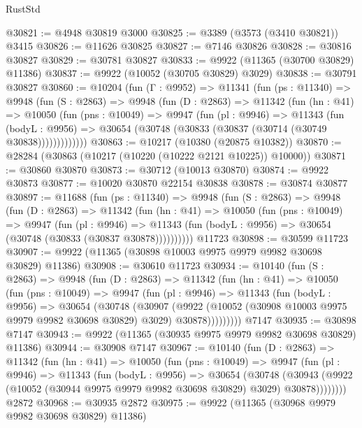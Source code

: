 \begin{lexlean}{RustStd}
\begin{coremodule}
@30821 := @4948 @30819 @3000
@30825 := @3389 (@3573 (@3410 @30821)) @3415
@30826 := @11626 @30825
@30827 := @7146 @30826
@30828 := @30816 @30827
@30829 := @30781 @30827
@30833 := @9922 (@11365 (@30700 @30829) @11386)
@30837 := @9922 (@10052 (@30705 @30829) @3029)
@30838 := @30791 @30827
@30860 := @10204
    (fun (Γ : @9952) =>
    @11341
      (fun (ps : @11340) =>
      @9948
        (fun (S : @2863) =>
        @9948
          (fun (D : @2863) =>
          @11342
            (fun (hn : @41) =>
            @10050
              (fun (pns : @10049) =>
              @9947
                (fun (pl : @9946) =>
                @11343
                  (fun (bodyL : @9956) =>
                  @30654 (@30748 (@30833 (@30837 (@30714 (@30749 @30838)))))))))))))
@30863 := @10217 (@10380 (@20875 @10382))
@30870 := @28284 (@30863 (@10217 (@10220 (@10222 @2121 @10225)) @10000))
@30871 := @30860 @30870
@30873 := @30712 (@10013 @30870)
@30874 := @9922 @30873
@30877 := @10020 @30870 @22154 @30838
@30878 := @30874 @30877
@30897 := @11688
    (fun (ps : @11340) =>
    @9948
      (fun (S : @2863) =>
      @9948
        (fun (D : @2863) =>
        @11342
          (fun (hn : @41) =>
          @10050
            (fun (pns : @10049) =>
            @9947
              (fun (pl : @9946) =>
              @11343 (fun (bodyL : @9956) => @30654 (@30748 (@30833 (@30837 @30878))))))))))
    @11723
@30898 := @30599 @11723
@30907 := @9922 (@11365 (@30898 @10003 @9975 @9979 @9982 @30698 @30829) @11386)
@30908 := @30610 @11723
@30934 := @10140
    (fun (S : @2863) =>
    @9948
      (fun (D : @2863) =>
      @11342
        (fun (hn : @41) =>
        @10050
          (fun (pns : @10049) =>
          @9947
            (fun (pl : @9946) =>
            @11343
              (fun (bodyL : @9956) =>
              @30654
                (@30748
                  (@30907
                    (@9922
                      (@10052 (@30908 @10003 @9975 @9979 @9982 @30698 @30829) @3029)
                      @30878)))))))))
    @7147
@30935 := @30898 @7147
@30943 := @9922 (@11365 (@30935 @9975 @9979 @9982 @30698 @30829) @11386)
@30944 := @30908 @7147
@30967 := @10140
    (fun (D : @2863) =>
    @11342
      (fun (hn : @41) =>
      @10050
        (fun (pns : @10049) =>
        @9947
          (fun (pl : @9946) =>
          @11343
            (fun (bodyL : @9956) =>
            @30654
              (@30748
                (@30943
                  (@9922 (@10052 (@30944 @9975 @9979 @9982 @30698 @30829) @3029) @30878))))))))
    @2872
@30968 := @30935 @2872
@30975 := @9922 (@11365 (@30968 @9979 @9982 @30698 @30829) @11386)

\end{coremodule}
\end{lexlean}
